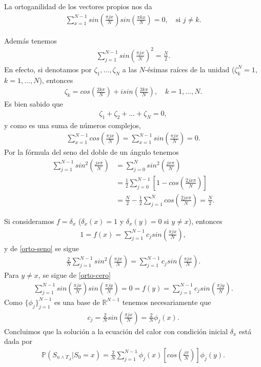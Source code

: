 \documentclass{article}
\numberwithin{equation}{section}
\begin{document}
La ortoganilidad de los vectores propios nos da
\begin{align}\label{orto-cero}
    \sum_{x=1}^{N-1}sin\left(\frac{\pi j x}{N}\right)sin\left(\frac{\pi k x}{N}\right) = 0, \quad \text{si }
j\not = k.
\end{align}

Además tenemos
\begin{align}\label{orto-seno}
    \sum_{j=1}^{N-1}sin\left(\frac{\pi j x}{N}\right)^2 = \frac{N}{2}.
\end{align}
En efecto, si denotamos por $\zeta_1,...,\zeta_N$ a las $N$-ésimas raíces de la unidad ($\zeta_k^N = 1$, $k = 1,...,N$), entonces
\begin{align*}
    \zeta_k = cos\left(\frac{2k\pi}{N}\right)+isin\left(\frac{2k\pi}{N}\right), \quad k=1,...,N.
\end{align*}
Es bien sabido que 
\begin{align*}
    \zeta_1+\zeta_2+...+\zeta_N = 0,
\end{align*}
y como es una suma de números complejos,
\begin{align*}
     \sum_{x=1}^{N-1}cos\left(\frac{\pi j x}{N}\right) = \sum_{x=1}^{N-1}sin\left(\frac{\pi j x}{N}\right) = 0.
\end{align*}
Por la fórmula del seno del doble de un ángulo tenemos
\begin{align*}
    \sum_{j=1}^{N-1}sin^2\left(\frac{jx\pi}{N} \right) &= \sum_{j=0}^{N}sin^2\left(\frac{jx\pi}{N} \right) \\
    &= \frac{1}{2}\sum_{j=0}^{N-1}\left[1-cos\left(\frac{2jx\pi}{N}\right)\right] \\
    &= \frac{N}{2}-\frac{1}{2}\sum_{j=1}^Ncos\left(\frac{2jx\pi}{N}\right) = \frac{N}{2}.
\end{align*}

Si consideramos $f = \delta_x$ ($\delta_x(x) = 1$ y $\delta_x(y) = 0$ si $y \not = x$), entonces
\begin{align*}
    1 = f(x) =  \sum_{j=1}^{N-1}c_jsin\left(\frac{\pi jx}{N}\right),
\end{align*}
y de \eqref{orto-seno} se sigue
\begin{align*}
\frac{2}{N}\sum_{j=1}^{N-1}sin^2\left(\frac{\pi j x}{N}\right) = \sum_{j=1}^{N-1}c_jsin\left(\frac{\pi jx}{N}\right). 
\end{align*}
Para $y \not = x$, se sigue de \eqref{orto-cero}
\begin{align*}
    \sum_{j=1}^{N-1}sin\left(\frac{\pi jx}{N}\right) sin\left(\frac{\pi jy}{N}\right) = 0 = f(y) =  \sum_{j=1}^{N-1}c_jsin\left(\frac{\pi jy}{N}\right).
\end{align*}
Como $\{\phi_j\}_{j=1}^{N-1}$ es una base de $\mathbb{R}^{N-1}$ tenemos necesariamente que
\begin{align*}
    c_j = \frac{2}{N}sin\left(\frac{\pi jx}{N}\right) = \frac{2}{N}\phi_j(x).
\end{align*}
Concluimos que la solución a la ecuación del calor con condición inicial $\delta_x$ está dada por
\begin{align*}
    \mathbb{P}\left(S_{n\land T_A} | S_0 = x\right) = \frac{2}{N}\sum_{j=1}^{N-1}\phi_j(x)\left[cos\left(\frac{j\pi}{N}\right)\right]\phi_j(y).
\end{align*}
\end{document}
